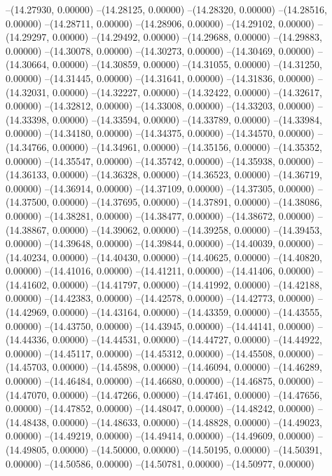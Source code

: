 --(14.27930, 0.00000)
--(14.28125, 0.00000)
--(14.28320, 0.00000)
--(14.28516, 0.00000)
--(14.28711, 0.00000)
--(14.28906, 0.00000)
--(14.29102, 0.00000)
--(14.29297, 0.00000)
--(14.29492, 0.00000)
--(14.29688, 0.00000)
--(14.29883, 0.00000)
--(14.30078, 0.00000)
--(14.30273, 0.00000)
--(14.30469, 0.00000)
--(14.30664, 0.00000)
--(14.30859, 0.00000)
--(14.31055, 0.00000)
--(14.31250, 0.00000)
--(14.31445, 0.00000)
--(14.31641, 0.00000)
--(14.31836, 0.00000)
--(14.32031, 0.00000)
--(14.32227, 0.00000)
--(14.32422, 0.00000)
--(14.32617, 0.00000)
--(14.32812, 0.00000)
--(14.33008, 0.00000)
--(14.33203, 0.00000)
--(14.33398, 0.00000)
--(14.33594, 0.00000)
--(14.33789, 0.00000)
--(14.33984, 0.00000)
--(14.34180, 0.00000)
--(14.34375, 0.00000)
--(14.34570, 0.00000)
--(14.34766, 0.00000)
--(14.34961, 0.00000)
--(14.35156, 0.00000)
--(14.35352, 0.00000)
--(14.35547, 0.00000)
--(14.35742, 0.00000)
--(14.35938, 0.00000)
--(14.36133, 0.00000)
--(14.36328, 0.00000)
--(14.36523, 0.00000)
--(14.36719, 0.00000)
--(14.36914, 0.00000)
--(14.37109, 0.00000)
--(14.37305, 0.00000)
--(14.37500, 0.00000)
--(14.37695, 0.00000)
--(14.37891, 0.00000)
--(14.38086, 0.00000)
--(14.38281, 0.00000)
--(14.38477, 0.00000)
--(14.38672, 0.00000)
--(14.38867, 0.00000)
--(14.39062, 0.00000)
--(14.39258, 0.00000)
--(14.39453, 0.00000)
--(14.39648, 0.00000)
--(14.39844, 0.00000)
--(14.40039, 0.00000)
--(14.40234, 0.00000)
--(14.40430, 0.00000)
--(14.40625, 0.00000)
--(14.40820, 0.00000)
--(14.41016, 0.00000)
--(14.41211, 0.00000)
--(14.41406, 0.00000)
--(14.41602, 0.00000)
--(14.41797, 0.00000)
--(14.41992, 0.00000)
--(14.42188, 0.00000)
--(14.42383, 0.00000)
--(14.42578, 0.00000)
--(14.42773, 0.00000)
--(14.42969, 0.00000)
--(14.43164, 0.00000)
--(14.43359, 0.00000)
--(14.43555, 0.00000)
--(14.43750, 0.00000)
--(14.43945, 0.00000)
--(14.44141, 0.00000)
--(14.44336, 0.00000)
--(14.44531, 0.00000)
--(14.44727, 0.00000)
--(14.44922, 0.00000)
--(14.45117, 0.00000)
--(14.45312, 0.00000)
--(14.45508, 0.00000)
--(14.45703, 0.00000)
--(14.45898, 0.00000)
--(14.46094, 0.00000)
--(14.46289, 0.00000)
--(14.46484, 0.00000)
--(14.46680, 0.00000)
--(14.46875, 0.00000)
--(14.47070, 0.00000)
--(14.47266, 0.00000)
--(14.47461, 0.00000)
--(14.47656, 0.00000)
--(14.47852, 0.00000)
--(14.48047, 0.00000)
--(14.48242, 0.00000)
--(14.48438, 0.00000)
--(14.48633, 0.00000)
--(14.48828, 0.00000)
--(14.49023, 0.00000)
--(14.49219, 0.00000)
--(14.49414, 0.00000)
--(14.49609, 0.00000)
--(14.49805, 0.00000)
--(14.50000, 0.00000)
--(14.50195, 0.00000)
--(14.50391, 0.00000)
--(14.50586, 0.00000)
--(14.50781, 0.00000)
--(14.50977, 0.00000)
